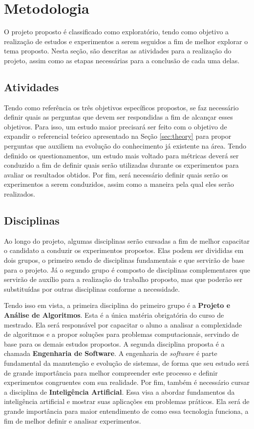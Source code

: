 \section{Metodologia}
\label{sec:methodology}

O projeto proposto é classificado como exploratório, tendo como objetivo a realização de estudos e experimentos a serem seguidos a fim de melhor explorar o tema proposto. Nesta seção, são descritas as atividades para a realização do projeto, assim como as etapas necessárias para a conclusão de cada uma delas.

\subsection{Atividades}

Tendo como referência os três objetivos específicos propostos, se faz necessário definir quais as perguntas que devem ser respondidas a fim de alcançar esses objetivos. Para isso, um estudo maior precisará ser feito com o objetivo de expandir o referencial teórico apresentado na Seção \ref{sec:theory} para propor perguntas que auxiliem na evolução do conhecimento já existente na área. Tendo definido os questionamentos, um estudo mais voltado para métricas deverá ser conduzido a fim de definir quais serão utilizadas durante os experimentos para avaliar os resultados obtidos. Por fim, será necessário definir quais serão os experimentos a serem conduzidos, assim como a maneira pela qual eles serão realizados.

\subsection{Disciplinas}

Ao longo do projeto, algumas disciplinas serão cursadas a fim de melhor capacitar o candidato a conduzir os experimentos propostos. Elas podem ser divididas em dois grupos, o primeiro sendo de disciplinas fundamentais e que servirão de base para o projeto. Já o segundo grupo é composto de disciplinas complementares que servirão de auxílio para a realização do trabalho proposto, mas que poderão ser substituídas por outras disciplinas conforme a necessidade.

Tendo isso em vista, a primeira disciplina do primeiro grupo é a \textbf{Projeto e Análise de Algoritmos}. Esta é a única matéria obrigatória do curso de mestrado. Ela será responsável por capacitar o aluno a analisar a complexidade de algoritmos e a propor soluções para problemas computacionais, servindo de base para os demais estudos propostos. A segunda disciplina proposta é a chamada \textbf{Engenharia de Software}. A engenharia de \textit{software} é parte fundamental da manutenção e evolução de sistemas, de forma que seu estudo será de grande importância para melhor compreender este processo e definir experimentos congruentes com sua realidade. Por fim, também é necessário cursar a disciplina de \textbf{Inteligência Artificial}. Essa visa a abordar fundamentos da inteligência artificial e mostrar suas aplicações em problemas práticos. Ela será de grande importância para maior entendimento de como essa tecnologia funciona, a fim de melhor definir e analisar experimentos.

